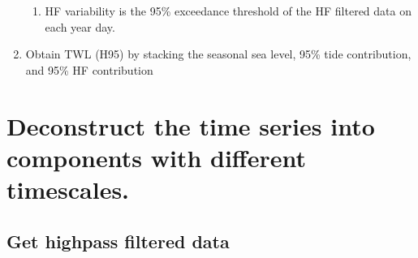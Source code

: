 \documentclass[letterpaper,10pt,english]{jupyterBook}
\begin{document}
\begin{enumerate}
\begin{enumerate}
\item {} 
\sphinxAtStartPar
HF variability is the 95\% exceedance threshold of the HF filtered data on each year day.

\end{enumerate}

\item {} 
\sphinxAtStartPar
Obtain TWL (H95) by stacking the seasonal sea level, 95\% tide contribution, and 95\% HF contribution

\end{enumerate}


\chapter{Deconstruct the time series into components with different timescales.}
\label{\detokenize{notebooks/regional_and_local/SL_Components_intra-annual:deconstruct-the-time-series-into-components-with-different-timescales}}

\section{Get high\sphinxhyphen{}pass filtered data}
\label{\detokenize{notebooks/regional_and_local/SL_Components_intra-annual:get-high-pass-filtered-data}}
\end{document}
